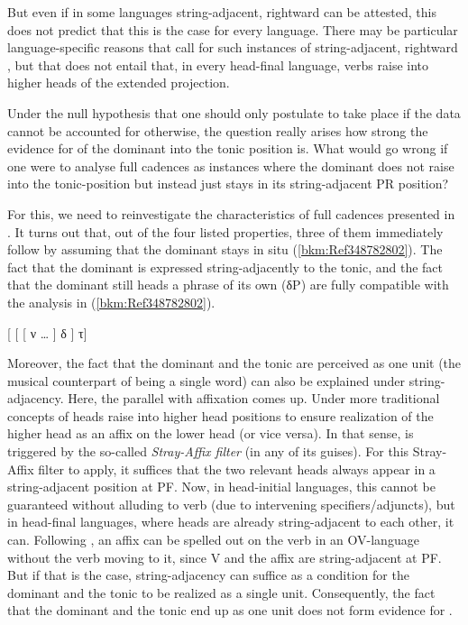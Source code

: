 \documentclass[output=paper]{langsci/langscibook}
\begin{document}
But even if in some languages string-adjacent, rightward  can be
attested, this does not predict that this is the case for every language. There
may be particular language-specific reasons that call for such instances of
string-adjacent, rightward , but that does not entail that, in
every head-final language, verbs raise into higher heads of the extended
projection.

Under the null hypothesis that one should only postulate  to take place
if the data cannot be accounted for otherwise, the question really arises how
strong the evidence for  of the dominant into the tonic position is.
What would go wrong if one were to analyse full cadences as instances where the
dominant does not raise into the tonic-position but instead just stays in its
string-adjacent \gls{PR} position?

For this, we need to reinvestigate the characteristics of full cadences
presented in . It turns out that, out of the four
listed properties, three of them immediately follow by assuming that the
dominant stays in situ (\ref{bkm:Ref348782802}). The fact that the dominant is
expressed string-adjacently to the tonic, and the fact that the dominant still
heads a phrase of its own (δP) are fully compatible with the analysis in
(\ref{bkm:Ref348782802}).

\ea\label{bkm:Ref348782802}
    {}[ [ [ ν \dots{} ] δ ] τ]
\z

Moreover, the fact that the dominant and the tonic are perceived as one unit
(the musical counterpart of being a single word) can also be explained under
string-adjacency. Here, the parallel with affixation comes up. Under more
traditional concepts of  heads raise into higher head positions to
ensure realization of the higher head as an affix on the lower head (or vice
versa). In that sense,  is triggered by the so-called
\emph{Stray-Affix filter} \parencite[cf.][]{Lasnik1981,Lasnik1995b,Baker1988}
(in any of its guises). For this Stray-Affix filter to apply, it suffices that
the two relevant heads always appear in a string-adjacent position at \gls{PF}.
Now, in head-initial languages, this cannot be guaranteed without alluding to
verb  (due to intervening specifiers/adjuncts), but in head-final
languages, where heads are already string-adjacent to each other, it can.
Following \citet{Bobaljik1995}, an affix can be spelled out on the verb in an
OV-language without the verb moving to it, since V and the affix are
string-adjacent at \gls{PF}.  But if that is the case, string-adjacency can
suffice as a condition for the dominant and the tonic to be realized as a
single unit. Consequently, the fact that the dominant and the tonic end up as
one unit does not form evidence for .
\end{document}
